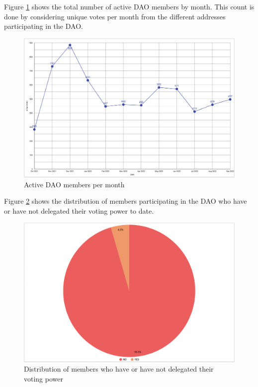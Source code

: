 \documentclass[MSE,Master,english]{twbook}%
\begin{document}
Figure \ref{fig:active_members} shows the total number of active DAO members by month. This count is done by considering unique votes per month from the different addresses participating in the DAO.
\begin{figure}[H]
  \centering
  \includegraphics[width=\textwidth]{metrics/active_members.png}
  \caption{Active DAO members per month}
  \label{fig:active_members}
\end{figure}

Figure \ref{fig:delegation_ratio} shows the distribution of members participating in the DAO who have or have not delegated their voting power to date.
\begin{figure}[H]
  \centering
  \includegraphics[width=\textwidth]{metrics/delegation_ratio.png}
  \caption{Distribution of members who have or have not delegated their voting power}
  \label{fig:delegation_ratio}
\end{figure}
\end{document}
